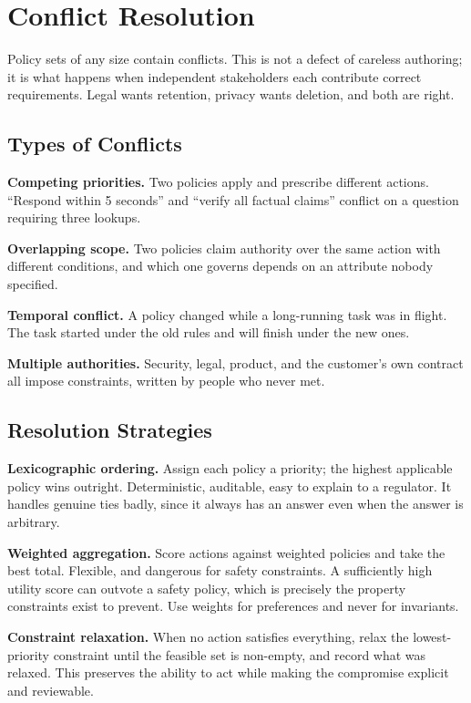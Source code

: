 \section{Conflict Resolution}

Policy sets of any size contain conflicts. This is not a defect of careless
authoring; it is what happens when independent stakeholders each contribute
correct requirements. Legal wants retention, privacy wants deletion, and both are
right.

\subsection{Types of Conflicts}

\textbf{Competing priorities.} Two policies apply and prescribe different actions.
``Respond within 5 seconds'' and ``verify all factual claims'' conflict on a
question requiring three lookups.

\textbf{Overlapping scope.} Two policies claim authority over the same action with
different conditions, and which one governs depends on an attribute nobody
specified.

\textbf{Temporal conflict.} A policy changed while a long-running task was in
flight. The task started under the old rules and will finish under the new ones.

\textbf{Multiple authorities.} Security, legal, product, and the customer's own
contract all impose constraints, written by people who never met.

\subsection{Resolution Strategies}

\textbf{Lexicographic ordering.} Assign each policy a priority; the highest
applicable policy wins outright. Deterministic, auditable, easy to explain to a
regulator. It handles genuine ties badly, since it always has an answer even when
the answer is arbitrary.

\textbf{Weighted aggregation.} Score actions against weighted policies and take
the best total. Flexible, and dangerous for safety constraints. A sufficiently
high utility score can outvote a safety policy, which is precisely the property
constraints exist to prevent. Use weights for preferences and never for
invariants.

\textbf{Constraint relaxation.} When no action satisfies everything, relax the
lowest-priority constraint until the feasible set is non-empty, and record what
was relaxed. This preserves the ability to act while making the compromise
explicit and reviewable.

